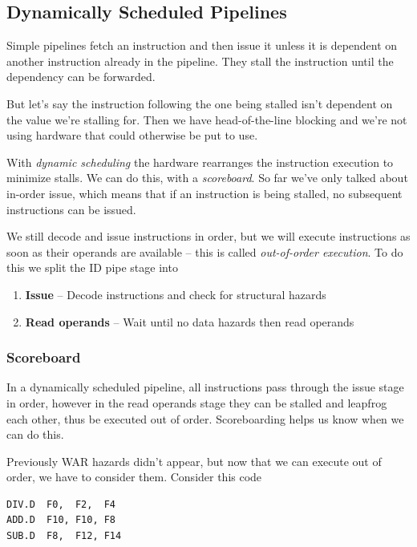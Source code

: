 \documentclass{article}
\begin{document}
\subsection{Dynamically Scheduled Pipelines}


Simple pipelines fetch an instruction and then issue it unless it is dependent on another instruction already in the pipeline. They stall the instruction until the dependency can be forwarded. 

But let's say the instruction following the one being stalled isn't dependent on the value we're stalling for. Then we have head-of-the-line blocking and we're not using hardware that could otherwise be put to use. 

With \textit{dynamic scheduling} the hardware rearranges the instruction execution to minimize stalls. We can do this, with a \textit{scoreboard}. So far we've only talked about in-order issue, which means that if an instruction is being stalled, no subsequent instructions can be issued. 

We still decode and issue instructions in order, but we will execute instructions as soon as their operands are available -- this is called \textit{out-of-order execution}. To do this we split the ID pipe stage into

\begin{enumerate}
\item \textbf{Issue} -- Decode instructions and check for structural hazards

\item \textbf{Read operands} -- Wait until no data hazards then read operands
\end{enumerate}

\subsubsection{Scoreboard}

In a dynamically scheduled pipeline, all instructions pass through the issue stage in order, however in the read operands stage they can be stalled and leapfrog each other, thus be executed out of order. Scoreboarding helps us know when we can do this. 

Previously WAR hazards didn't appear, but now that we can execute out of order, we have to consider them. Consider this code

\begin{verbatim}
DIV.D  F0,  F2,  F4
ADD.D  F10, F10, F8
SUB.D  F8,  F12, F14
\end{verbatim}
\end{document}
